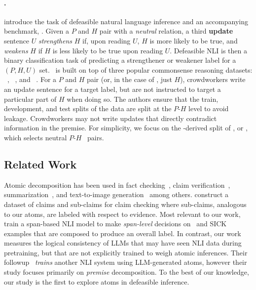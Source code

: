 \paragraph{\dnli.}
\citet{rudinger-etal-2020-thinking} introduce the task of defeasible natural language inference and an accompanying benchmark, \dnli. 
%
Given a $P$ and $H$ pair with a \textit{neutral} relation, a third \textbf{update} sentence $U$ \textit{strengthens} $H$ if, upon reading $U$, $H$ is more likely to be true, and \textit{weakens} $H$ if $H$ is less likely to be true upon reading $U$.
%
%
Defeasible NLI is then a binary classification task of predicting a strengthener or weakener label for a $(P, H, U)$ set.
% 
\dnli~is built on top of three popular commonsense reasoning datasets: \snli~\cite{bowman-etal-2015-large}, ~\cite{sap2019atomic}, and ~\cite{forbes2020social}.
%
For a $P$ and $H$ pair (or, in the case of , just $H$), crowdworkers write an update sentence for a target label, but are not instructed to target a particular part of $H$ when doing so.
%
The authors ensure that the train, development, and test splits of the data are split at the $P$-$H$ level to avoid leakage.
%
Crowdworkers may not write updates that directly contradict information in the premise.
%
For simplicity, we focus on the \snli-derived split of \dnli, or \dsnli, which selects neutral $P$-$H$ \snli~pairs.


\subsection{Related Work}
Atomic decomposition has been used in fact checking~\cite{min-etal-2023-factscore, glover-etal-2022-revisiting, yuan-vlachos-2024-zero}, claim verification~\cite{chen-etal-2024-complex}, summarization~\cite{nenkova-passonneau-2004-evaluating}, and text-to-image generation~\cite{cho2023davidsonian} among others.
%
\citet{kamoi-etal-2023-wice} construct a dataset of claims and sub-claims for claim checking where sub-claims, analogous to our atoms, are labeled with respect to evidence.
%
Most relevant to our work, \citet{stacey-etal-2022-logical} train a span-based NLI model to make \textit{span-level} decisions on \snli~and SICK examples that are composed to produce an overall label. 
%
In contrast, our work measures the logical consistency of LLMs that may have seen NLI data during pretraining, but that are not explicitly trained to weigh atomic inferences.
%
Their followup~\cite{stacey-etal-2024-atomic} \textit{trains} another NLI system using LLM-generated atoms, however their study focuses primarily on \textit{premise} decomposition.
%
To the best of our knowledge, our study is the first to explore atoms in defeasible inference.